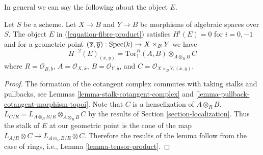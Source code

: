 \noindent
In general we can say the following about the object $E$.

\begin{lemma}
\label{lemma-fibre-product}
Let $S$ be a scheme. Let $X \to B$ and $Y \to B$ be morphisms of algebraic
spaces over $S$. The object $E$ in (\ref{equation-fibre-product}) satisfies
$H^i(E) = 0$ for $i = 0, -1$ and for a geometric point
$(\overline{x}, \overline{y}) : \mathop{\mathrm{Spec}}(k) \to X \times_B Y$ we have
$$
H^{-2}(E)_{(\overline{x}, \overline{y})} =
\text{Tor}_1^R(A, B) \otimes_{A \otimes_R B} C
$$
where $R = \mathcal{O}_{B, \overline{b}}$, $A = \mathcal{O}_{X, \overline{x}}$,
$B = \mathcal{O}_{Y, \overline{y}}$, and
$C = \mathcal{O}_{X \times_B Y, (\overline{x}, \overline{y})}$.
\end{lemma}

\begin{proof}
The formation of the cotangent complex commutes with taking stalks
and pullbacks, see
Lemmas \ref{lemma-stalk-cotangent-complex} and
\ref{lemma-pullback-cotangent-morphism-topoi}.
Note that $C$ is a henselization of $A \otimes_R B$.
$L_{C/R} = L_{A \otimes_R B/R} \otimes_{A \otimes_R B} C$
by the results of Section \ref{section-localization}.
Thus the stalk of $E$ at our geometric point is the cone of the
map $L_{A/R} \otimes C \to L_{A \otimes_R B/R} \otimes C$.
Therefore the results of the lemma follow from
the case of rings, i.e., Lemma \ref{lemma-tensor-product}.
\end{proof}














